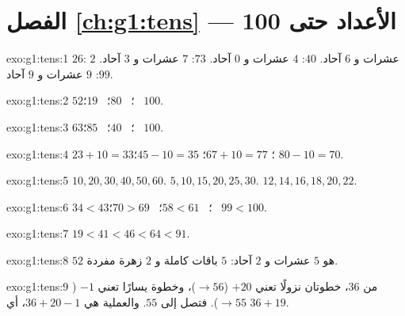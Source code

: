 \section*{الفصل \ref{ch:g1:tens} --- الأعداد حتى 100}

\begin{solution}{exo:g1:tens:1}
$26$: $2$ عشرات و $6$ آحاد. $40$: $4$ عشرات و $0$ آحاد. $73$: $7$
عشرات و $3$ آحاد. $99$: $9$ عشرات و $9$ آحاد.
\end{solution}

\begin{solution}{exo:g1:tens:2}
$52$؛ \ $80$؛ \ $19$؛ \ $100$.
\end{solution}

\begin{solution}{exo:g1:tens:3}
$63$؛ \ $40$؛ \ $85$؛ \ $100$.
\end{solution}

\begin{solution}{exo:g1:tens:4}
$23 + 10 = 33$؛ \quad $67 + 10 = 77$؛ \quad $45 - 10 = 35$؛ \quad
$80 - 10 = 70$.
\end{solution}

\begin{solution}{exo:g1:tens:5}
$10, 20, 30, 40, 50, 60$. \quad $5, 10, 15, 20, 25, 30$. \quad
$12, 14, 16, 18, 20, 22$.
\end{solution}

\begin{solution}{exo:g1:tens:6}
$34 < 43$؛ \ $58 < 61$؛ \ $70 > 69$؛ \ $99 < 100$.
\end{solution}

\begin{solution}{exo:g1:tens:7}
$19 < 41 < 46 < 64 < 91$.
\end{solution}

\begin{solution}{exo:g1:tens:8}
$52$ هو $5$ عشرات و $2$ آحاد: $5$ باقات كاملة و $2$ زهرة
مفردة.
\end{solution}

\begin{solution}{exo:g1:tens:9}
من $36$، خطوتان نزولًا تعني $+20$ ($\to 56$)، وخطوة يسارًا تعني
$-1$ ($\to 55$). فتصل إلى $55$. والعملية هي
$36 + 20 - 1$، أي $36 + 19$.
\end{solution}
